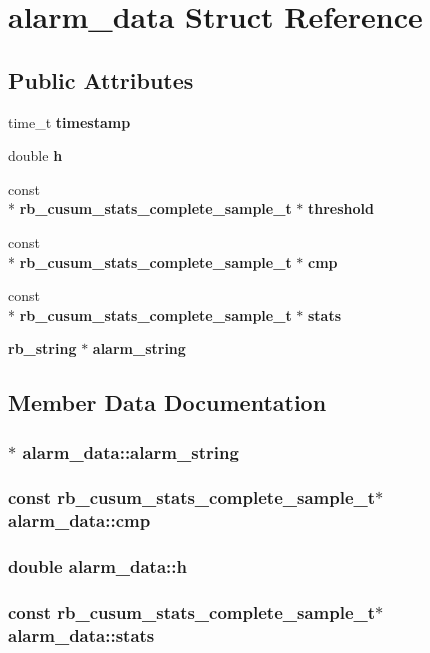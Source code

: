 \section{alarm\_data Struct Reference}
\label{structalarm__data}
\subsection*{Public Attributes}
\begin{DoxyCompactItemize}
\item 
time\_t {\bf timestamp}
\item 
double {\bf h}
\item 
const \\*
{\bf rb\_cusum\_stats\_complete\_sample\_t} $\ast$ {\bf threshold}
\item 
const \\*
{\bf rb\_cusum\_stats\_complete\_sample\_t} $\ast$ {\bf cmp}
\item 
const \\*
{\bf rb\_cusum\_stats\_complete\_sample\_t} $\ast$ {\bf stats}
\item 
{\bf rb\_string} $\ast$ {\bf alarm\_string}
\end{DoxyCompactItemize}


\subsection{Member Data Documentation}
\subsubsection[{alarm\_string}]{$\ast$ alarm\_data\+::alarm\_string}\label{structalarm__data_a94f34cd011ac7406e39438626ec6b130}
\subsubsection[{cmp}]{\setlength{\rightskip}{0pt plus 5cm}const {\bf rb\_cusum\_stats\_complete\_sample\_t}$\ast$ alarm\_data\+::cmp}\label{structalarm__data_a9087eb7cf55536c65a5b861a2bd7c055}
\subsubsection[{h}]{\setlength{\rightskip}{0pt plus 5cm}double alarm\_data\+::h}\label{structalarm__data_a6699d975b95a6b70d9c7dd65062b2b38}
\subsubsection[{stats}]{\setlength{\rightskip}{0pt plus 5cm}const {\bf rb\_cusum\_stats\_complete\_sample\_t}$\ast$ alarm\_data\+::stats}\label{structalarm__data_a4a3f04da04b4a79a62a55fca81d9ec2d}

